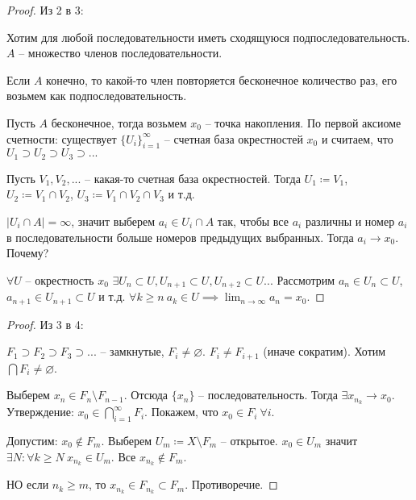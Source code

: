 \documentclass[main]{subfiles}
\begin{document}
\begin{proof}
    Из 2 в 3:

    Хотим для любой последовательности иметь сходящуюся подпоследовательность.
    $A$ -- множество членов последовательности.

    Если $A$ конечно, то какой-то член повторяется бесконечное количество раз, его возьмем как подпоследовательность.

    Пусть $A$ бесконечное, тогда возьмем $x_0$ -- точка накопления.
    По первой аксиоме счетности: существует $\{U_i\}_{i=1}^\infty$ -- счетная база окрестностей $x_0$ и считаем, что $U_1 \supset U_2 \supset U_3 \supset ...$

    Пусть $V_1, V_2, ...$ -- какая-то счетная база окрестностей.
    Тогда $U_1 \coloneqq V_1$, $U_2 \coloneqq V_1 \cap V_2$, $U_3 \coloneqq V_1 \cap V_2 \cap V_3$ и т.д.

    $|U_i \cap A| = \infty$, значит выберем $a_i \in U_i \cap A$ так, чтобы все $a_i$ различны и номер $a_i$ в последовательности больше номеров предыдущих выбранных.
    Тогда $a_i \to x_0$. Почему?

    $\forall U$ -- окрестность $x_0$ $\exists U_n \subset U, U_{n+1} \subset U, U_{n+2} \subset U...$
    Рассмотрим $a_n \in U_n \subset U$, $a_{n+1} \in U_{n+1} \subset U$ и т.д.
    $\forall k\ge n\ a_k \in U \implies \lim_{n \to \infty} a_n = x_0$.
\end{proof}
\begin{proof}
    Из 3 в 4:

    $F_1 \supset F_2 \supset F_3 \supset ...$ -- замкнутые, $F_i \neq \varnothing$.
    $F_i \neq F_{i+1}$ (иначе сократим).
    Хотим $\bigcap F_i \neq \varnothing$.

    Выберем $x_n \in F_n \setminus F_{n-1}$.
    Отсюда $\{x_n\}$ -- последовательность.
    Тогда $\exists x_{n_k} \to x_0$.
    Утверждение: $x_0 \in \bigcap_{i=1}^\infty F_i$. Покажем, что $x_0 \in F_i\ \forall i$.

    Допустим: $x_0 \not\in F_m$.
    Выберем $U_m \coloneqq X \setminus F_m$ -- открытое.
    $x_0 \in U_m$ значит $\exists N: \forall k \ge N\ x_{n_k} \in U_m$.
    Все $x_{n_k} \not\in F_m$.

    НО если $n_k \ge m$, то $x_{n_k} \in F_{n_k} \subset F_m$. Противоречие.
\end{proof}
\end{document}
